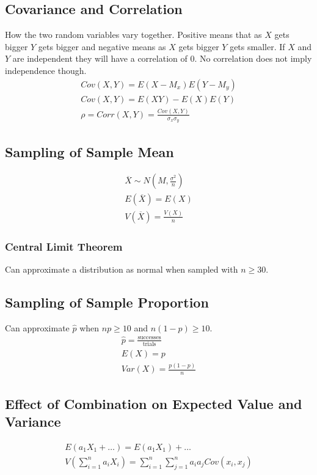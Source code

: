 \subsection{Covariance and Correlation}
How the two random variables vary together. Positive means that as $X$ gets bigger $Y$ gets bigger and negative means as $X$ gets bigger $Y$ gets smaller. If $X$ and $Y$ are independent they will have a correlation of $0$. No correlation does not imply independence though. 
\begin{align}
  Cov(X, Y) = E(X - M_x)E(Y - M_y) \\
  Cov(X, Y) = E(XY) - E(X)E(Y) \\
  \rho = Corr(X, Y) = \frac{Cov(X, Y)}{\sigma_x\sigma_y}
\end{align}

\subsection{Sampling of Sample Mean}
\begin{align}
  \overbar{X} \sim N(M, \frac{\sigma^2}{n}) \\
  E(\overbar{X}) = E(X) \\
  V(\overbar{X}) = \frac{V(X)}{n}
\end{align}

\subsubsection{Central Limit Theorem}
Can approximate a distribution as normal when sampled with $n \geq 30$.

\subsection{Sampling of Sample Proportion}
Can approximate $\hat{p}$ when $np \geq 10$ and $n(1 - p) \geq 10$.
\begin{align}
  \hat{p} = \frac{\text{successes}}{\text{trials}} \\
  E(X) = p \\
  Var(X) = \frac{p(1-p)}{n}
\end{align}

\subsection{Effect of Combination on Expected Value and Variance}
\begin{align}
  E(a_1X_1 + \ldots) = E(a_1X_1) + \ldots \\
  V(\sum_{i=1}^{n} a_iX_i) = \sum_{i=1}^{n} \sum_{j=1}^{n} a_ia_jCov(x_i, x_j)
\end{align}


